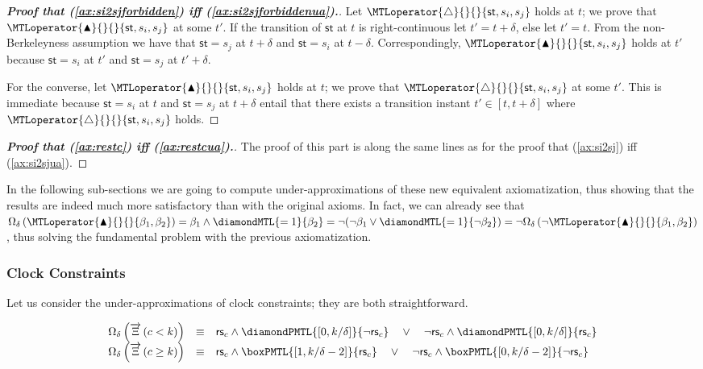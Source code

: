 \documentclass[a4paper]{article}
\newcommand{\frf}[1]{(\ref{#1})}
\newcommand{\underap}[1]{\Omega_{\delta}\left({#1}\right)}
\newcommand{\st}{\mathsf{st}}
\newcommand{\rest}[1]{\mathsf{rs}_{#1}}
\newcommand{\becomesMTL}[1]{\MTLoperator{\triangle}{}{}{#1}}
\newcommand{\becomesOMTL}[1]{\MTLoperator{\blacktriangle}{}{}{#1}}
\newcommand{\becomesLMTL}[1]{\becomesOMTL{#1}}
\newcommand{\XiL}{\overrightarrow{\Xi}}
\theoremstyle{plain}
\theoremstyle{definition}
\begin{document}
\begin{proof}[\textbf{Proof that \frf{ax:si2sjforbidden} iff \frf{ax:si2sjforbiddenua}.}]
Let $\becomesMTL{\st, s_i, s_j}$ holds at $t$; we prove that $\becomesLMTL{\st, s_i, s_j}$ at some $t'$.
If the transition of $\st$ at $t$ is right-continuous let $t' = t+\delta$, else let $t' = t$.
From the non-Berkeleyness assumption we have that $\st = s_j$ at $t+\delta$ and $\st = s_i$ at $t-\delta$.
Correspondingly, $\becomesLMTL{\st, s_i, s_j}$ holds at $t'$ because $\st = s_i$ at $t'$ and $\st = s_j$ at $t'+\delta$.

For the converse, let $\becomesLMTL{\st, s_i, s_j}$ holds at $t$; we prove that $\becomesMTL{\st, s_i, s_j}$ at some $t'$.
This is immediate because $\st = s_i$ at $t$ and $\st = s_j$ at $t+\delta$ entail that there exists a transition instant $t' \in [t, t+\delta]$ where $\becomesMTL{\st, s_i, s_j}$ holds.
\end{proof}



\begin{proof}[\textbf{Proof that \frf{ax:restc} iff \frf{ax:restcua}.}]
The proof of this part is along the same lines as for the proof that \frf{ax:si2sj} iff \frf{ax:si2sjua}.
\end{proof}


In the following sub-sections we are going to compute under-approximations of these new equivalent axiomatization, thus showing that the results are indeed much more satisfactory than with the original axioms.
In fact, we can already see that $\underap{\becomesLMTL{\beta_1, \beta_2}} = \beta_1 \wedge \diamondMTL{=1}{\beta_2} = \neg (\neg \beta_1 \vee \diamondMTL{=1}{\neg \beta_2}) = \neg \underap{\neg \becomesLMTL{\beta_1, \beta_2}}$, thus solving the fundamental problem with the previous axiomatization.










\subsubsection{Clock Constraints}
Let us consider the under-ap\-prox\-i\-ma\-tions of clock constraints; they are both straightforward.

\begin{equation*}
  \begin{array}{lcl}
	 \underap{\XiL\left(c < k\right)}      &   \equiv  &
	           \rest{c} \wedge \diamondPMTL{[0,k/\delta]}{\neg \rest{c}}
				  \quad \vee \quad
	           \neg \rest{c} \wedge \diamondPMTL{[0,k/\delta]}{\rest{c}} \\
	 \underap{\XiL\left(c \geq k\right)}      &   \equiv  &
	           \rest{c} \wedge \boxPMTL{[1,k/\delta - 2]}{\rest{c}}
				  \quad \vee \quad
	           \neg \rest{c} \wedge \boxPMTL{[0,k/\delta - 2]}{\neg \rest{c}}
  \end{array}
\end{equation*}
\end{document}
